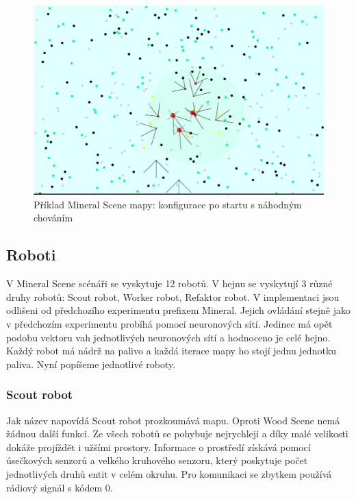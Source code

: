 \begin{figure}[h]\centering
	\includegraphics[width=\columnwidth]{../img/MineralMap/MineralRandom.png}
	\caption{Příklad Mineral Scene mapy: konfigurace po startu s  náhodným chováním}
	\label{obr04:MineralSceneRandomStart}
\end{figure}
\clearpage 
\subsection*{Roboti}
V Mineral Scene scénáři se vyskytuje 12 robotů. V hejnu se vyskytují 3 různé druhy robotů: Scout robot, Worker robot, Refaktor robot. V implementaci jsou odlišeni od předchozího experimentu prefixem Mineral. Jejich ovládání stejně jako v předchozím experimentu probíhá pomocí neuronových sítí. Jedinec má opět podobu vektoru vah jednotlivých neuronových sítí a hodnoceno je celé hejno. Každý robot má nádrž na palivo a každá iterace mapy ho stojí jednu jednotku paliva. Nyní popíšeme jednotlivé roboty.
\subsubsection{Scout robot}
Jak název napovídá Scout robot prozkoumává mapu. Oproti Wood Scene nemá žádnou další funkci. Ze všech robotů se pohybuje nejrychleji a díky malé velikosti dokáže projíždět i užšími prostory. Informace o prostředí získává pomocí úsečkových senzorů a velkého kruhového senzoru, který poskytuje počet jednotlivých druhů entit v celém okruhu. Pro komunikaci se zbytkem používá rádiový signál s kódem 0. 
\par  

